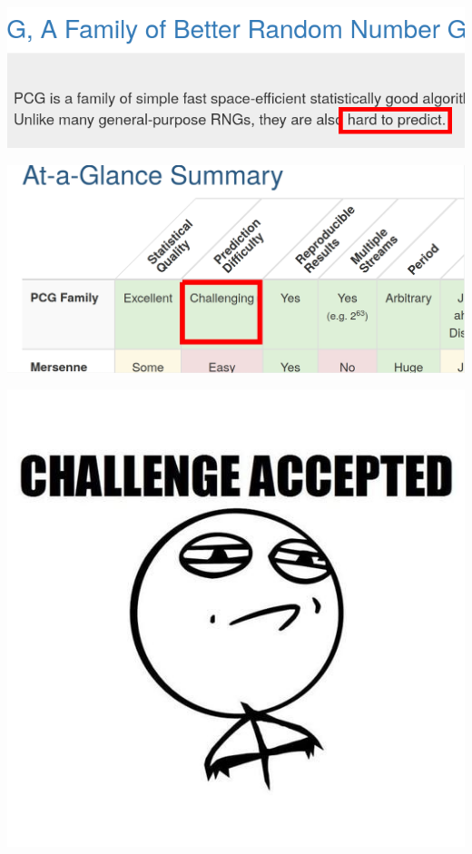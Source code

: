 \documentclass[11pt,xcolor={x11names,svgnames}]{beamer}
\begin{document}
\begin{frame}[label=why]
    \centering
    \includegraphics[width=\textwidth]{pictures/hard.png}
    \vfill
  \end{frame}

\begin{frame}[label=why]
    \centering
    \includegraphics[width=0.9\linewidth]{pictures/PCG_challenging.jpg}
\end{frame}

\begin{frame}[label=why]
    \centering
    \includegraphics[height=\textheight]{pictures/accepted.jpg}
\end{frame}
\end{document}
